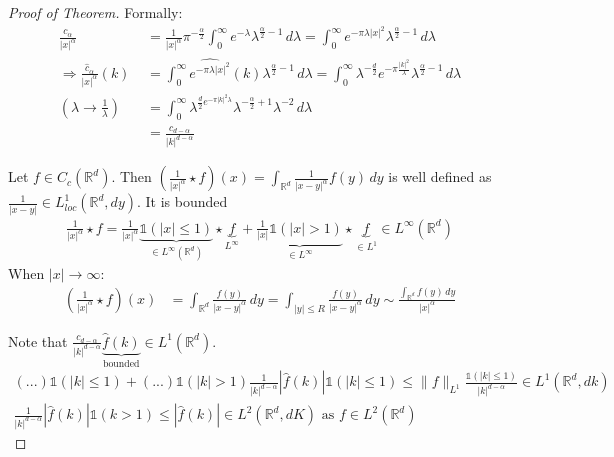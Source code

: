 \documentclass{report}
\theoremstyle{tommy}
\newcommand{\Rd}{\mathbb{R}^d}
\begin{document}
  \begin{proof}[Proof of Theorem]
    Formally:
    \begin{align*}
      \frac{c_\alpha}{|x|^\alpha} &= \frac{1}{|x|^\alpha} \pi^{- \frac{\alpha}{2}} \int_0^\infty e^{-\lambda} \lambda^{\frac{\alpha}{2} -1} \, d \lambda = \int_0^\infty e^{- \pi \lambda |x|^2} \lambda^{\frac{\alpha}{2}-1} \, d \lambda \\
      \Rightarrow \frac{\hat c_\alpha}{|x|^\alpha}(k) &= \int_0^\infty \widehat{e^{- \pi \lambda |x|^2}}(k) \lambda^{\frac{\alpha}{2}-1} \, d \lambda = \int_0^\infty \lambda^{-\frac{d}{2}} e^{- \pi \frac{|k|^2}{\lambda}} \lambda^{\frac{\alpha}{2}-1} \, d \lambda \\
      (\lambda \to \frac{1}{\lambda}) \quad &= \int_0^\infty \lambda^{\frac{d}{2} e^{- \pi |k|^2 \lambda}} \lambda^{- \frac{\alpha}{2} + 1} \lambda^{-2} \, d\lambda \\
      &= \frac{c_{d-\alpha}}{|k|^{d-\alpha}}
    \end{align*}

    Let \(f \in C_c(\Rd)\). Then \(\left(\frac{1}{|x|^\alpha} \star f\right)(x) = \int_{\Rd} \frac{1}{|x-y|^\alpha} f(y) \, dy\) is well defined as \(\frac{1}{|x-y|} \in L_{loc}^1(\mathbb{R}^d, dy)\). It is bounded
    \begin{align*}
      \frac{1}{|x|^\alpha} \star f = \frac{1}{|x|^\alpha} \underbrace{\mathbb{1}(|x| \le 1)}_{\in L^\infty(\Rd)} \star \underbrace{f}_{L^\infty} + \underbrace{\frac{1}{|x|} \mathbb{1}(|x| > 1)}_{\in L^\infty} \star \underbrace{f}_{\in L^1} \in L^\infty(\Rd)
    \end{align*}
    When \(|x| \to \infty\):
    \begin{align*}
      \left(\frac{1}{|x|^\alpha} \star f\right)(x) &= \int_{\Rd} \frac{f(y)}{|x-y|^\alpha} \, dy = \int_{|y| \le R} \frac{f(y)}{|x-y|^\alpha} \, dy \sim \frac{\int_{\Rd} f(y) \, dy}{|x|^\alpha}
    \end{align*}

    Note that \(\frac{c_{d-\alpha}}{|k|^{d-\alpha}} \underbrace{\hat f(k)}_{\text{bounded}} \in L^1(\Rd)\).
    \begin{align*}
      (...) \mathbb{1}(|k| \le 1) + (...) \mathbb{1}(|k|> 1)
      \frac{1}{|k|^{d - \alpha}}|\hat f(k)| \mathbb{1}(|k| \le 1) \le \|f\|_{L^1} \frac{\mathbb{1}(|k| \le 1)}{|k|^{d-\alpha}} \in L^1(\Rd, dk) \\
      \frac{1}{|k|^{d-\alpha}} |\hat f(k)| \mathbb{1}(k >1) \le |\hat f(k)| \in L^2(\Rd, dK) \text{ as } f \in L^2(\Rd)
    \end{align*}


\end{proof}
\end{document}
